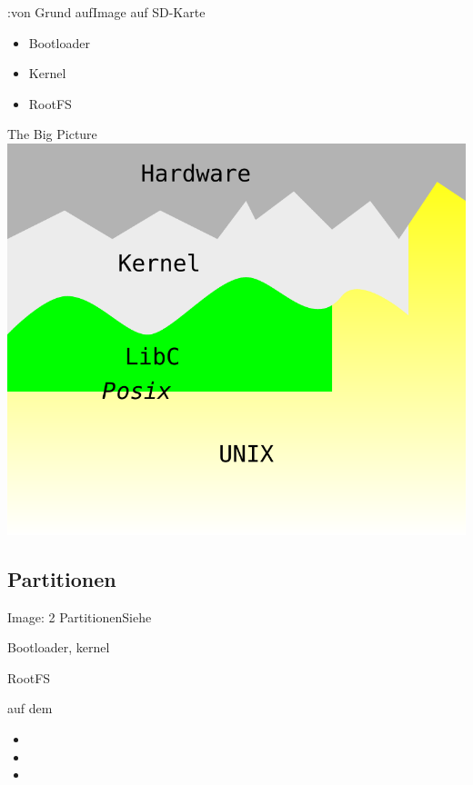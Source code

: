 \begin{frame}{\linux:von Grund auf}{Image auf SD-Karte}
 \begin{itemize}
  \item Bootloader
  \item Kernel
  \item RootFS
 \end{itemize}
\end{frame}

\begin{frame}{The Big Picture}
\includegraphics[width=\textwidth]{layers.pdf}
\end{frame}

\subsection{Partitionen}
\begin{frame}{Image: 2 Partitionen}{Siehe }
 \begin{description}[Partition 1: p1]
  \item[Partition 1: p1]  Bootloader, kernel 
  \item[Partition 2: p2]  RootFS
  \item[Befehle] auf dem \host
  \begin{itemize}
   \item {} 
   \item {}
   \item {}
  \end{itemize}
 \end{description}
\end{frame}

